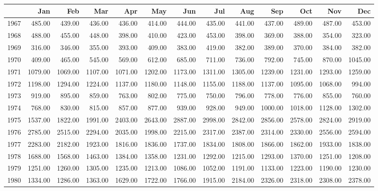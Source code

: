\begin{longtable}{rrrrrrrrrrrrr}
  \hline
 & Jan & Feb & Mar & Apr & May & Jun & Jul & Aug & Sep & Oct & Nov & Dec \\ 
  \hline
1967 & 485.00 & 439.00 & 436.00 & 436.00 & 414.00 & 444.00 & 435.00 & 441.00 & 437.00 & 489.00 & 487.00 & 453.00 \\ 
  1968 & 488.00 & 455.00 & 448.00 & 398.00 & 410.00 & 423.00 & 453.00 & 398.00 & 369.00 & 388.00 & 354.00 & 323.00 \\ 
  1969 & 316.00 & 346.00 & 355.00 & 393.00 & 409.00 & 383.00 & 419.00 & 382.00 & 389.00 & 370.00 & 384.00 & 382.00 \\ 
  1970 & 409.00 & 465.00 & 545.00 & 569.00 & 612.00 & 685.00 & 711.00 & 736.00 & 792.00 & 745.00 & 870.00 & 1045.00 \\ 
  1971 & 1079.00 & 1069.00 & 1107.00 & 1071.00 & 1202.00 & 1173.00 & 1311.00 & 1305.00 & 1239.00 & 1231.00 & 1293.00 & 1259.00 \\ 
  1972 & 1198.00 & 1294.00 & 1224.00 & 1137.00 & 1180.00 & 1148.00 & 1155.00 & 1188.00 & 1137.00 & 1095.00 & 1068.00 & 994.00 \\ 
  1973 & 919.00 & 895.00 & 859.00 & 763.00 & 802.00 & 775.00 & 750.00 & 796.00 & 778.00 & 776.00 & 855.00 & 760.00 \\ 
  1974 & 768.00 & 830.00 & 815.00 & 857.00 & 877.00 & 939.00 & 928.00 & 949.00 & 1000.00 & 1018.00 & 1128.00 & 1302.00 \\ 
  1975 & 1537.00 & 1822.00 & 1991.00 & 2403.00 & 2643.00 & 2887.00 & 2998.00 & 2842.00 & 2856.00 & 2578.00 & 2824.00 & 2919.00 \\ 
  1976 & 2785.00 & 2515.00 & 2294.00 & 2035.00 & 1998.00 & 2215.00 & 2317.00 & 2387.00 & 2314.00 & 2330.00 & 2556.00 & 2594.00 \\ 
  1977 & 2283.00 & 2182.00 & 1923.00 & 1816.00 & 1836.00 & 1737.00 & 1834.00 & 1808.00 & 1866.00 & 1862.00 & 1933.00 & 1838.00 \\ 
  1978 & 1688.00 & 1568.00 & 1463.00 & 1384.00 & 1358.00 & 1231.00 & 1292.00 & 1215.00 & 1293.00 & 1370.00 & 1251.00 & 1208.00 \\ 
  1979 & 1251.00 & 1260.00 & 1305.00 & 1235.00 & 1213.00 & 1086.00 & 1052.00 & 1191.00 & 1133.00 & 1223.00 & 1190.00 & 1230.00 \\ 
  1980 & 1334.00 & 1286.00 & 1363.00 & 1629.00 & 1722.00 & 1766.00 & 1915.00 & 2184.00 & 2326.00 & 2318.00 & 2308.00 & 2378.00 \\ 

\end{longtable}
